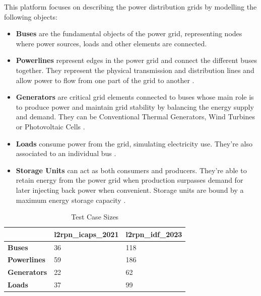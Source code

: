 This platform focuses on describing the power distribution grids by modelling the following objects:
\begin{itemize}
	\item \textbf{Buses} are the fundamental objects of the power grid, representing nodes where power sources, loads and other elements are connected\cite{rtefranceGrid2OpDocumentation}.
	
	\item \textbf{Powerlines} represent edges in the power grid and connect the different buses together. They represent the physical transmission and distribution lines and allow power to flow from one part of the grid to another \cite{rtefranceGrid2OpDocumentation}.
	
	\item \textbf{Generators} are critical grid elements connected to buses whose main role is to produce power and maintain grid stability by balancing the energy supply and demand. They can be Conventional Thermal Generators, Wind Turbines or Photovoltaic Cells \cite{rtefranceGrid2OpDocumentation}.
	
	\item \textbf{Loads} consume power from the grid, simulating electricity use. They're also associated to an individual bus \cite{rtefranceGrid2OpDocumentation}.
	
	\item \textbf{Storage Units} can act as both consumers and producers. They're able to retain energy from the power grid when production surpasses demand for later injecting back power when convenient. Storage units are bound by a maximum energy storage capacity \cite{rtefranceGrid2OpDocumentation}.
\end{itemize}

\begin{table}[H] 
	\centering
	\caption{Test Case Sizes}
	\begin{tabular}{|P{2cm}|P{3.5cm}|P{3.5cm}|  }
		\hline
		 & \textbf{l2rpn\_icaps\_2021} & \textbf{l2rpn\_idf\_2023} \\
		\hline
		\textbf{Buses} & 36 & 118 \\
		\hline
		\textbf{Powerlines} & 59  & 186  \\
		\hline
		\textbf{Generators} & 22 & 62  \\
		\hline
		\textbf{Loads} & 37 & 99 \\
		\hline
	\end{tabular}
	\label{tab:test-case}
\end{table}

